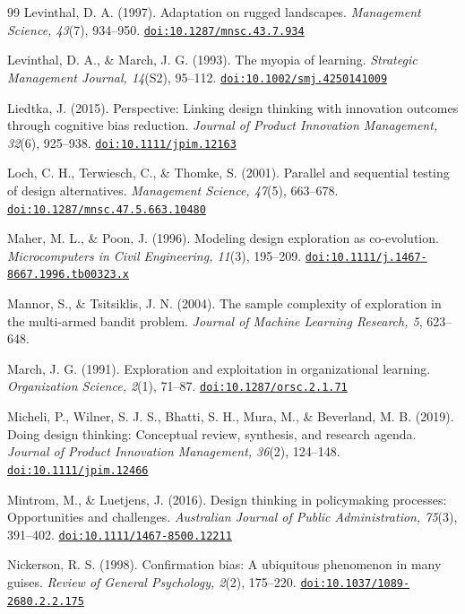 \documentclass[10pt,twocolumn]{article}
\providecommand{\doi}[1]{\href{https://doi.org/#1}{\nolinkurl{doi:#1}}}
\theoremstyle{definition}
\begin{document}
\begin{thebibliography}{99}
 Levinthal, D. A. (1997). Adaptation on rugged landscapes. \textit{Management Science, 43}(7), 934--950. \doi{10.1287/mnsc.43.7.934}

 Levinthal, D. A., \& March, J. G. (1993). The myopia of learning. \textit{Strategic Management Journal, 14}(S2), 95--112. \doi{10.1002/smj.4250141009}

 Liedtka, J. (2015). Perspective: Linking design thinking with innovation outcomes through cognitive bias reduction. \textit{Journal of Product Innovation Management, 32}(6), 925--938. \doi{10.1111/jpim.12163}

 Loch, C. H., Terwiesch, C., \& Thomke, S. (2001). Parallel and sequential testing of design alternatives. \textit{Management Science, 47}(5), 663--678. \doi{10.1287/mnsc.47.5.663.10480}

 Maher, M. L., \& Poon, J. (1996). Modeling design exploration as co-evolution. \textit{Microcomputers in Civil Engineering, 11}(3), 195--209. \doi{10.1111/j.1467-8667.1996.tb00323.x}

 Mannor, S., \& Tsitsiklis, J. N. (2004). The sample complexity of exploration in the multi-armed bandit problem. \textit{Journal of Machine Learning Research, 5}, 623--648.

 March, J. G. (1991). Exploration and exploitation in organizational learning. \textit{Organization Science, 2}(1), 71--87. \doi{10.1287/orsc.2.1.71}

 Micheli, P., Wilner, S. J. S., Bhatti, S. H., Mura, M., \& Beverland, M. B. (2019). Doing design thinking: Conceptual review, synthesis, and research agenda. \textit{Journal of Product Innovation Management, 36}(2), 124--148. \doi{10.1111/jpim.12466}

 Mintrom, M., \& Luetjens, J. (2016). Design thinking in policymaking processes: Opportunities and challenges. \textit{Australian Journal of Public Administration, 75}(3), 391--402. \doi{10.1111/1467-8500.12211}

 Nickerson, R. S. (1998). Confirmation bias: A ubiquitous phenomenon in many guises. \textit{Review of General Psychology, 2}(2), 175--220. \doi{10.1037/1089-2680.2.2.175}


\end{thebibliography}
\end{document}
